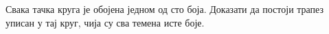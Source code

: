 Свака тачка круга је обојена једном од сто боја.
Доказати да постоји трапез уписан у тај круг, чија су сва темена исте боје.

\solution

